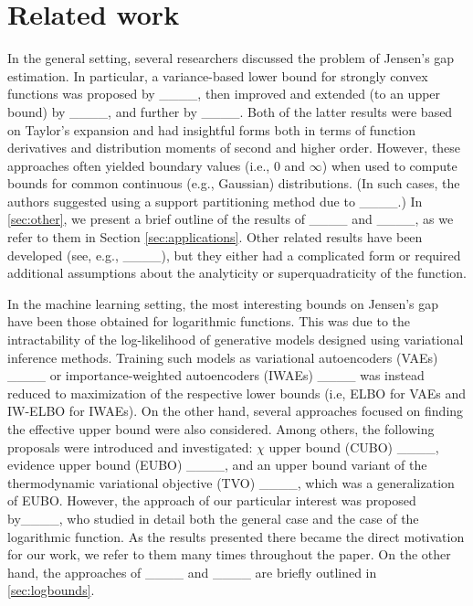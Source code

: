 \section{Related work}
\label{sec:relwork}

In the general setting, several researchers discussed the problem of Jen\-sen's gap estimation. 
In particular, a variance-based lower bound for strongly convex functions was proposed by ____, then improved and extended (to an upper bound) by ____, and further by ____. Both of the latter results were based on Taylor's expansion and had insightful forms both in terms of function derivatives and distribution moments of second and higher order. However, these approaches often yielded boundary values (i.e., 0 and $\infty$) when used to compute bounds for common continuous (e.g., Gaussian) distributions. (In such cases, the authors suggested using a support partitioning method due to ____.) In \ref{sec:other}, we present a brief outline of the results of ____ and ____, as we refer to them in Section \ref{sec:applications}.
Other related results have been developed (see, e.g., ____), but they either had a complicated form or required additional assumptions about the analyticity or superquadraticity of the function.

In the machine learning setting, the most interesting bounds on Jensen's gap have been those obtained for logarithmic functions. This was due to the intractability of the log-likelihood of generative models designed using variational inference methods. Training such models as variational autoencoders (VAEs) ____ or importance-weighted autoencoders (IWAEs) ____ was instead reduced to maximization of the respective lower bounds (i.e, ELBO for VAEs and IW-ELBO for IWAEs). On the other hand, several approaches focused on finding the effective upper bound were also considered. Among others, the following proposals were introduced and investigated: $\chi$ upper bound (CUBO) ____, evidence upper bound (EUBO) ____, and an upper bound variant of the thermodynamic variational objective (TVO) ____, which was a generalization of EUBO. However, the approach of our particular interest was proposed by____, who studied in detail both the general case and the case of the logarithmic function. As the results presented there became the direct motivation for our work, we refer to them many times throughout the paper. On the other hand, the approaches of ____ and ____ are briefly outlined in \ref{sec:logbounds}.